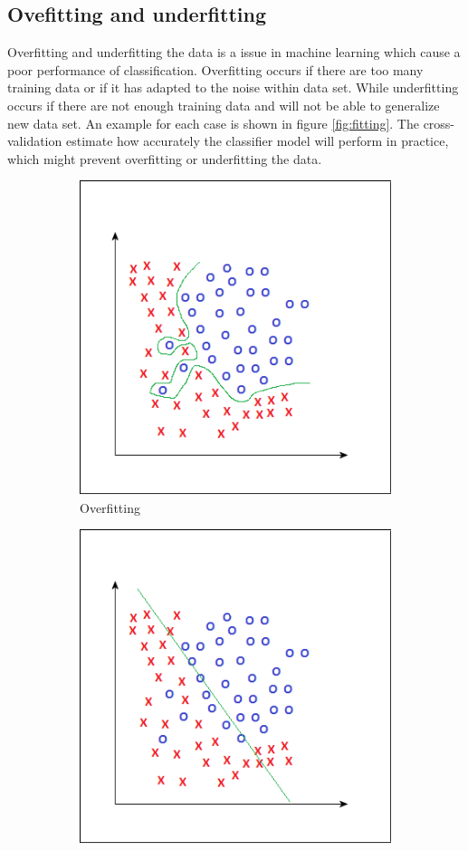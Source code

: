 \documentclass[USenglish]{ifimaster}  %
\begin{document}
\subsection{Ovefitting and underfitting}
Overfitting and underfitting the data is a issue in machine learning which cause a poor performance of classification. Overfitting occurs if there are too many training data or if it has adapted to the noise within data set. While underfitting occurs if there are not enough training data and will not be able to generalize new data set. An example for each case is shown in figure \ref{fig:fitting}. The cross-validation estimate how accurately the classifier model will perform in practice, which might prevent overfitting or underfitting the data.

	\begin{figure}[h]
		\begin{subfigure}{0.5\linewidth}
			\centering
			\includegraphics[scale=0.43]{Figures/Overfitting}
			\caption{Overfitting}
			\label{fig:over}
		\end{subfigure}%
		\begin{subfigure}{.5\linewidth}
			\centering
			\includegraphics[scale=0.43]{Figures/Underfitting}

\end{subfigure}
\end{figure}
\end{document}
